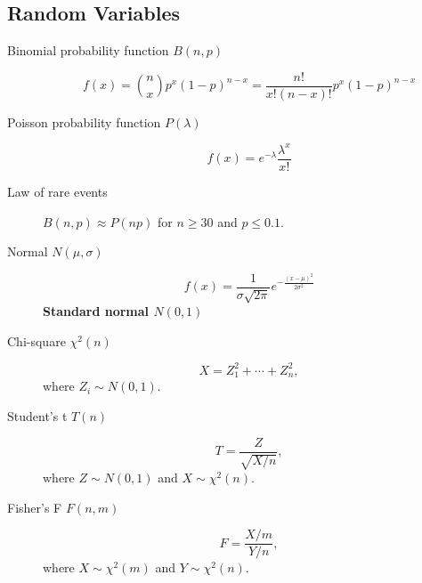 \begin{multicols*}{2}
\subsection*{Random Variables}

\begin{tcolorbox}[hbox, title=Discrete]
\begin{minipage}{0.4\textwidth}
\begin{description}
\item [Binomial probability function $B(n,p)$]
      \[f(x)=\binom{n}{x}p^x (1-p)^{n-x}=\dfrac{n!}{x!(n-x)!}p^x (1-p)^{n-x}\]
\item [Poisson probability function $P(\lambda)$]
      \[f(x)=e^{-\lambda}\frac{\lambda^x}{x!}\]
\item [Law of rare events] $B(n,p)\approx P(np)$ for $n\geq 30$ and $p\leq 0.1$.
\end{description}
\end{minipage}
\end{tcolorbox}

\begin{tcolorbox}[hbox, title=Continuous]
\begin{minipage}{0.4\textwidth}
\begin{description}
\item[Normal $N(\mu,\sigma)$]
      \[f(x)= \frac{1}{\sigma\sqrt{2\pi}}e^{-\frac{(x-\mu)^2}{2\sigma^2}}\]
      \textbf{Standard normal $N(0,1)$}
\item[Chi-square $\chi^2(n)$]
      \[X = Z_1^2+\cdots +Z_n^2,\]
      where $Z_i\sim N(0,1)$.
\item[Student's t $T(n)$]
      \[T = \frac{Z}{\sqrt{X/n}},\]
      where $Z\sim N(0,1)$ and $X\sim \chi^2(n)$.
\item[Fisher's F $F(n,m)$]
      \[F = \frac{X/m}{Y/n},\]
      where $X\sim \chi^2(m)$ and $Y\sim \chi^2(n)$.
\end{description}
\end{minipage}
\end{tcolorbox}

\end{multicols*}